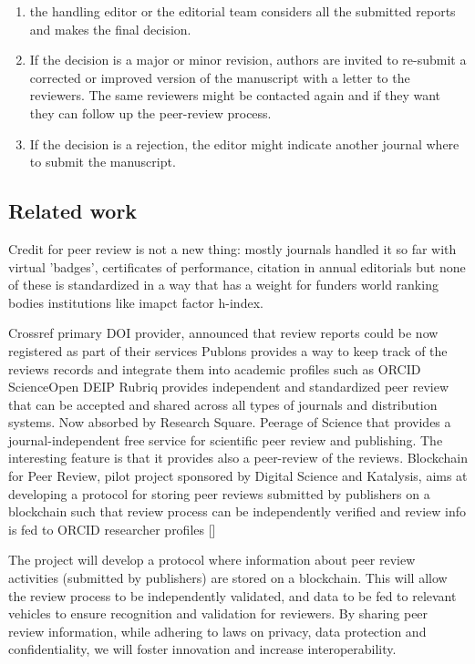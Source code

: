 \documentclass[runningheads]{llncs}
\begin{document}
\begin{enumerate}
    \item the handling editor or the editorial team considers all the submitted reports and makes the final decision.
    \item If the decision is a major or minor revision, authors are invited to re-submit a corrected or improved version of the manuscript with a letter to the reviewers. The same reviewers might be contacted again and if they want they can follow up the peer-review process. 
    \item If the decision is a rejection, the editor might indicate another journal where to submit the manuscript. 
    
\end{enumerate}

\subsection{Related work}

Credit for peer review is not a new thing: mostly journals handled it so far with virtual 'badges', certificates of performance, citation in annual editorials but none of these is standardized in a way that has a weight for funders world ranking bodies institutions like imapct factor h-index. 

Crossref primary DOI provider, announced that review reports could be now registered as part of their services
Publons provides a way to keep track of the reviews records and integrate them into academic profiles such as ORCID
ScienceOpen
DEIP
Rubriq provides independent and standardized peer review that can be accepted and shared across all types of journals and distribution systems. Now absorbed by Research Square.
Peerage of Science that provides a journal-independent free service for scientific peer review and publishing. The interesting feature is that it provides also a peer-review of the reviews. 
Blockchain for Peer Review, pilot project sponsored by Digital Science and Katalysis, aims at developing a protocol for storing peer reviews submitted by publishers on a blockchain such that review process can be independently verified and review info is fed to ORCID researcher profiles []

The project will develop a protocol where information about peer review activities (submitted by publishers) are stored on a blockchain. This will allow the review process to be independently validated, and data to be fed to relevant vehicles to ensure recognition and validation for reviewers.  By sharing peer review information, while adhering to laws on privacy, data protection and confidentiality, we will foster innovation and increase interoperability.
\end{document}
